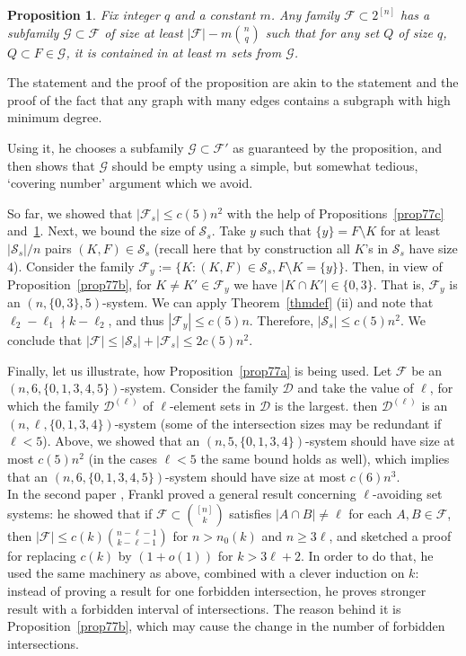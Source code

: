 \documentclass[graybox]{svmult}
\renewcommand{\le}{\leqslant}
\renewcommand{\ge}{\geqslant}
\newcommand{\ff}{\mathcal{F}}
\newcommand{\m}{\mathcal}
\newtheorem{prop}[thm]{Proposition}
\begin{document}
\begin{prop}\label{prop77d}
  Fix integer $q$ and a constant $m$. Any family $\ff\subset 2^{[n]}$ has a subfamily $\m G\subset \ff$ of size at least $|\ff|- m{n\choose q}$ such that for any set $Q$ of size $q$, $Q\subset F\in\m G$, it is contained in at least $m$ sets from $\m G$.
\end{prop}
The statement and the proof of the proposition are akin to the statement and the proof of the fact that any graph with many edges contains a subgraph with high minimum degree.


Using it, he chooses a subfamily $\m G\subset \ff'$ as guaranteed by the proposition, and then shows that $\m G$ should be empty using a simple, but somewhat tedious, `covering number' argument which we avoid.

So far, we showed that $|\ff_s|\le c(5)n^2$ with the help of Propositions~\ref{prop77c} and~\ref{prop77d}. Next, we bound the size of $\m S_s$. Take $y$ such that $\{y\} = F\setminus K$ for at least $|\m S_s|/n$ pairs $(K,F)\in \m S_s$ (recall here that by construction all $K$'s in $\m S_s$ have size $4$). Consider the family $\ff_y:=\{K: (K,F)\in \m S_s, F\setminus K = \{y\}\}$. Then, in view of Proposition~\ref{prop77b}, for $K\ne K'\in \ff_y$ we have $|K\cap K'|\in \{0,3\}$. That is, $\ff_y$ is an $(n,\{0,3\}, 5)$-system. We can apply Theorem~\ref{thmdef} (ii) and note that $\ell_2-\ell_1\nmid k-\ell_2$, and thus $|\ff_y|\le c(5)n$. Therefore, $|\m S_s|\le c(5)n^2$. We conclude that $|\ff|\le |\m S_s|+|\ff_s|\le 2c(5)n^2$.



Finally, let us illustrate, how Proposition~\ref{prop77a} is being used. Let $\ff$ be an $(n,6,\{0,1,3,4,5\})$-system. Consider the family $\m D$ and take the value of $\ell$, for which the family $\m D^{(\ell)}$ of $\ell$-element sets in $\m D$  is the largest. then $\m D^{(\ell)}$ is an $(n,\ell,\{0,1,3,4\})$-system (some of the intersection sizes may be redundant if $\ell<5$). Above, we showed that an $(n,5,\{0,1,3,4\})$-system should have size at most $c(5)n^2$ (in the cases $\ell<5$ the same bound holds as well), which implies that an $(n,6,\{0,1,3,4,5\})$-system should have size at most $c(6)n^{3}$.\\






In the second paper \cite{Fra80a}, Frankl proved a general result concerning $\ell$-avoiding set systems: he showed that if $\ff\subset {[n]\choose k}$ satisfies $|A\cap B|\ne \ell$ for each $A,B\in \ff$, then $|\ff|\le c(k){n-\ell-1\choose k-\ell-1}$ for $n>n_0(k)$ and $n\ge 3\ell$, and sketched a proof for replacing $c(k)$ by $(1+o(1))$ for $k>3\ell+2$. In order to do that, he used the same machinery as above, combined with a clever induction on $k$: instead of proving a result for one forbidden intersection, he proves stronger result with a forbidden interval of intersections. The reason behind it is Proposition~\ref{prop77b}, which may cause the change in the number of forbidden intersections.
\end{document}
